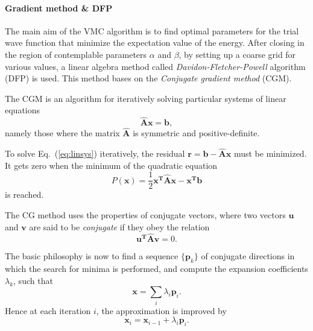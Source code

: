 \paragraph{Gradient method \& DFP}
The main aim of the VMC algorithm is to find optimal parameters for the trial wave function that minimize the expectation value of the energy. After closing in the region of contemplable parameters $\alpha$  and $\beta$, by setting up a coarse grid for various values, a linear algebra method called \textit{Davidon-Fletcher-Powell} algorithm (DFP)\cite{nocedal1999numerical} is used. This method bases on the \textit{Conjugate gradient method} (CGM).

The CGM is an algorithm for iteratively solving particular systems of linear equations 
\begin{equation}
\mathbf{\hat A x = b},
\label{eq:linsys}
\end{equation}
namely those where the matrix $\mathbf{\hat A}$ is symmetric and positive-definite.  

To solve Eq.~(\ref{eq:linsys}) iteratively, the residual $\mathbf{r = b-\hat{A}x}$ must be minimized. It gets zero when the minimum of the quadratic equation
\[
P(\mathbf{x}) = \frac{1}{2} \mathbf{x^T \hat A x - x^T b}
\]
is reached.

The CG method uses the properties of conjugate vectors, where two vectors $\mathbf{u}$ and $\mathbf{v}$ are said to be \textit{conjugate} if they obey the relation
\begin{equation}
\mathbf{u^T \hat{A} v} = 0.
\label{eq:CGM}
\end{equation}

The basic philosophy is now to find a sequence $\lbrace \mathbf{p}_k \rbrace$   of conjugate directions in which the search for minima is performed, and compute the expansion coefficients $\lambda_k$, such that
\[
\mathbf{x} = \sum\limits_{i} \lambda_i \mathbf{p}_i. 
\]
Hence at each iteration $i$, the approximation is improved by
\[
\mathbf{x}_i = \mathbf{x}_{i-1} + \lambda_i \mathbf{p}_i.
\]


